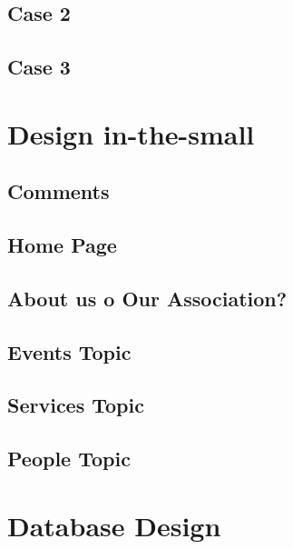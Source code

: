 \documentclass[11pt, a4paperm, hidelinks]{article}
\begin{document}
	\subsection{Case 2}
	

	\subsection{Case 3}
	
	\clearpage


	\section{Design in-the-small}

	\subsection{Comments}

	\subsection{Home Page}
	
	\clearpage

	\subsection{About us o Our Association?}
	
	\clearpage

	\subsection{Events Topic}
	
	\clearpage

	\subsection{Services Topic}
	
	\clearpage

	\subsection{People Topic}
	
	\clearpage

	\section{Database Design}	
	
	\clearpage
\end{document}
